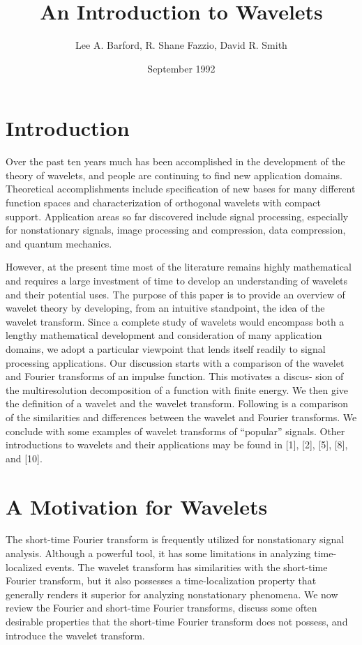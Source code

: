 \documentclass[a4paper,12pt]{article}
\begin{document}
\title{An Introduction to Wavelets}
\author{Lee A. Barford, R. Shane Fazzio, David R. Smith}

\date{September 1992}
\maketitle


\section{Introduction}

Over the past ten years much has been accomplished in the development of the theory of wavelets, and people are
continuing to find new application domains. Theoretical accomplishments include specification of new bases for many
different function spaces and characterization of orthogonal wavelets with compact support. Application areas so far
discovered include signal processing, especially for nonstationary signals, image processing and compression, data
compression, and quantum mechanics.

However, at the present time most of the literature remains highly mathematical and requires a large investment of time
to develop an understanding of wavelets and their potential uses. The purpose of this paper is to provide an overview
of wavelet theory by developing, from an intuitive standpoint, the idea of the wavelet transform. Since a complete
study of wavelets would encompass both a lengthy mathematical development and consideration of many application
domains, we adopt a particular viewpoint that lends itself readily to signal processing applications. Our discussion
starts with a comparison of the wavelet and Fourier transforms of an impulse function. This motivates a discus- sion
of the multiresolution decomposition of a function with finite energy. We then give the definition of a wavelet and
the wavelet transform. Following is a comparison of the similarities and differences between the wavelet and Fourier
transforms. We conclude with some examples of wavelet transforms of ``popular'' signals. Other introductions to
wavelets and their applications may be found in [1], [2], [5], [8], and [10].

\section{A Motivation for Wavelets}

The short-time Fourier transform is frequently utilized for nonstationary signal analysis. Although a powerful tool, it
has some limitations in analyzing time-localized events. The wavelet transform has similarities with the short-time
Fourier transform, but it also possesses a time-localization property that generally renders it superior for analyzing
nonstationary phenomena. We now review the Fourier and short-time Fourier transforms, discuss some often desirable
properties that the short-time Fourier transform does not possess, and introduce the wavelet transform.
\end{document}
